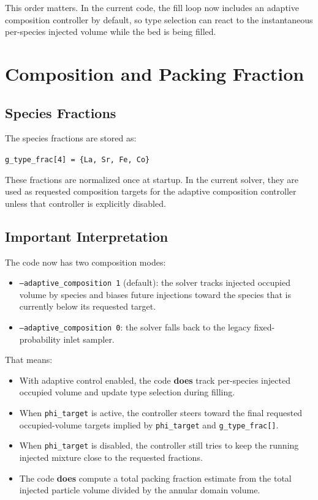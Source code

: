 \documentclass[11pt]{article}
\begin{document}
This order matters. In the current code, the fill loop now includes an adaptive composition controller by default, so type selection can react to the instantaneous per-species injected volume while the bed is being filled.

\section{Composition and Packing Fraction}

\subsection{Species Fractions}

The species fractions are stored as:
\begin{center}
\texttt{g\_type\_frac[4] = \{La, Sr, Fe, Co\}}
\end{center}

These fractions are normalized once at startup. In the current solver, they are used as requested composition targets for the adaptive composition controller unless that controller is explicitly disabled.

\subsection{Important Interpretation}

The code now has two composition modes:
\begin{itemize}
  \item \texttt{--adaptive\_composition 1} (default): the solver tracks injected occupied volume by species and biases future injections toward the species that is currently below its requested target.
  \item \texttt{--adaptive\_composition 0}: the solver falls back to the legacy fixed-probability inlet sampler.
\end{itemize}

That means:
\begin{itemize}
  \item With adaptive control enabled, the code \textbf{does} track per-species injected occupied volume and update type selection during filling.
  \item When \texttt{phi\_target} is active, the controller steers toward the final requested occupied-volume targets implied by \texttt{phi\_target} and \texttt{g\_type\_frac[]}.
  \item When \texttt{phi\_target} is disabled, the controller still tries to keep the running injected mixture close to the requested fractions.
  \item The code \textbf{does} compute a total packing fraction estimate from the total injected particle volume divided by the annular domain volume.
\end{itemize}
\end{document}

